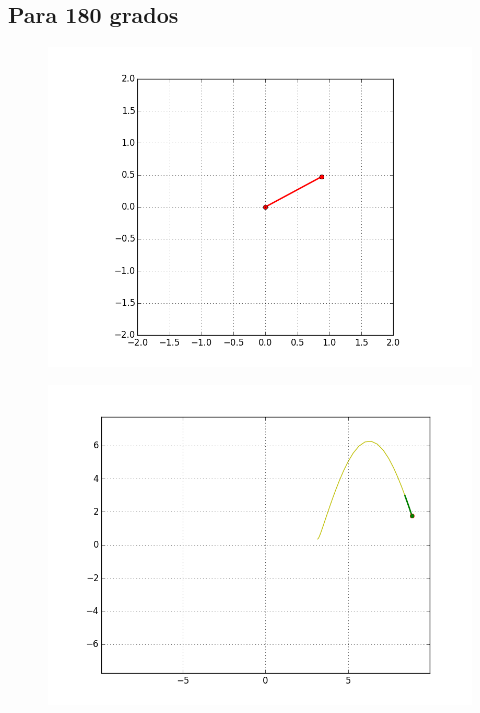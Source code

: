 \documentclass[12pt]{article}
\begin{document}
\subsection{Para 180 grados}
\begin{figure}[H]
\includegraphics[scale=.6]{180p}
\end{figure}
\begin{figure}[H]
\includegraphics[scale=.6]{180e}
\end{figure}
\end{document}
